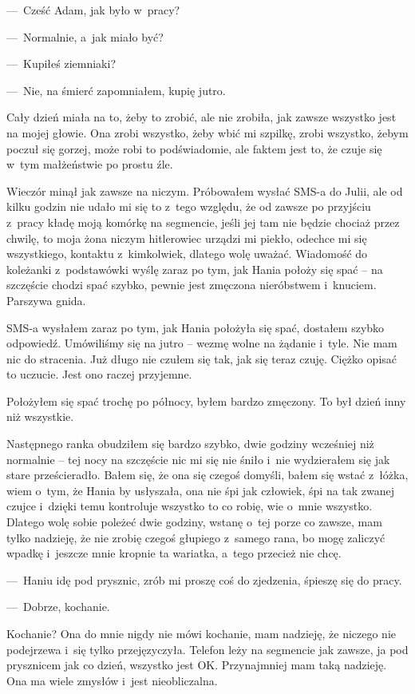 ---~Cześć Adam, jak było w~pracy?

---~Normalnie, a~jak miało być?

---~Kupiłeś ziemniaki?

---~Nie, na śmierć zapomniałem, kupię jutro.

Cały dzień miała na to, żeby to zrobić, ale nie zrobiła, jak zawsze wszystko jest na mojej głowie. Ona zrobi wszystko, żeby wbić mi szpilkę, zrobi wszystko, żebym poczuł się gorzej, może robi to podświadomie, ale faktem jest to, że czuje się w~tym małżeństwie po prostu źle.

Wieczór minął jak zawsze na niczym. Próbowałem wysłać SMS-a do Julii, ale od kilku godzin nie udało mi się to z~tego względu, że od zawsze po przyjściu z~pracy kładę moją komórkę na segmencie, jeśli jej tam nie będzie chociaż przez chwilę, to moja żona niczym hitlerowiec urządzi mi piekło, odechce mi się wszystkiego, kontaktu z~kimkolwiek, dlatego wolę uważać. Wiadomość do koleżanki z~podstawówki wyślę zaraz po tym, jak Hania położy się spać – na szczęście chodzi spać szybko, pewnie jest zmęczona nieróbstwem i~knuciem. Parszywa gnida.

SMS-a wysłałem zaraz po tym, jak Hania położyła się spać, dostałem szybko odpowiedź. Umówiliśmy się na jutro -- wezmę wolne na żądanie i~tyle. Nie mam nic do stracenia. Już długo nie czułem się tak, jak się teraz czuję. Ciężko opisać to uczucie. Jest ono raczej przyjemne.

Położyłem się spać trochę po północy, byłem bardzo zmęczony. To był dzień inny niż wszystkie.

\paraSep

Następnego ranka obudziłem się bardzo szybko, dwie godziny wcześniej niż normalnie -- tej nocy na szczęście nic mi się nie śniło i~nie wydzierałem się jak stare prześcieradło. Bałem się, że ona się czegoś domyśli, bałem się wstać z~łóżka, wiem o~tym, że Hania by usłyszała, ona nie śpi jak człowiek, śpi na tak zwanej czujce i~dzięki temu kontroluje wszystko to co robię, wie o~mnie wszystko. Dlatego wolę sobie poleżeć dwie godziny, wstanę o~tej porze co zawsze, mam tylko nadzieję, że nie zrobię czegoś głupiego z~samego rana, bo mogę zaliczyć wpadkę i~jeszcze mnie kropnie ta wariatka, a~tego przecież nie chcę.

---~Haniu idę pod prysznic, zrób mi proszę coś do zjedzenia, śpieszę się do pracy.

---~Dobrze, kochanie.

Kochanie? Ona do mnie nigdy nie mówi kochanie, mam nadzieję, że niczego nie podejrzewa i~się tylko przejęzyczyła. Telefon leży na segmencie jak zawsze, ja pod prysznicem jak co dzień, wszystko jest OK. Przynajmniej mam taką nadzieję. Ona ma wiele zmysłów i~jest nieobliczalna.

